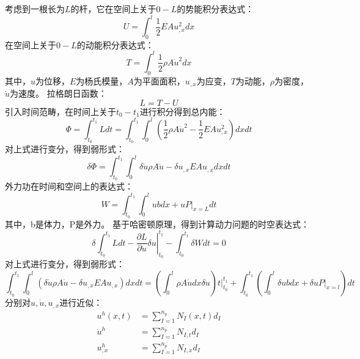 考虑到一根长为$L$的杆，它在空间上关于$0-L$的势能积分表达式：
\begin{equation}\label{3.1}
U = \int_{0}^{l} \frac{1}{2} EA u_{,x}^2 dx
\end{equation}
在空间上关于$0-L$的动能积分表达式：
\begin{equation}\label{3.2}
T = \int_{0}^{l} \frac{1}{2} \rho A \dot u^2 dx
\end{equation}
其中，$u$为位移，$E$为杨氏模量，$A$为平面面积，$u_{,x}$为应变，$T$为动能，$\rho$为密度，$\dot u$为速度。
拉格朗日函数：
\begin{equation}\label{3.3}
L = T-U
\end{equation}
引入时间范畴，在时间上关于$t_0 - t_1$进行积分得到总内能：
\begin{equation}\label{3.4}
\Phi = \int_{t_0}^{t_1} L dt = \int_{t_0}^{t_1} \int_{0}^{l} (\frac{1}{2} \rho A \dot u^2 - \frac{1}{2} EA u_{,x}^2) dx dt
\end{equation}
对上式进行变分，得到弱形式：
\begin{equation}\label{3.5}
\delta \Phi = \int_{t_0}^{t_1} \int_{0}^{l} \delta \dot u \rho A \dot u - \delta u_{,x} EA u_{,x} dx dt 
\end{equation}
外力功在时间和空间上的表达式：
\begin{equation}\label{3.6}
W = \int_{t_0}^{t_1} \int_{0}^{l}ub dx  +uP \vert_{x=L} dt
\end{equation}
其中，b是体力，P是外力。
基于哈密顿原理，得到计算动力问题的时空表达式：
\begin{equation}\label{3.7}
\delta \int_{t_0}^{t_1} L dt - \left . \frac{\partial L}{\partial \dot u} \delta u \right \vert_{t_0}^{t_1} - \int_{t_0}^{t_1} \delta W dt = 0
\end{equation}
对上式进行变分，得到弱形式：
\begin{equation}\label{3.8}
 \int_{t_0}^{t_1} \int_{0}^{l} (\delta \dot u \rho A \dot u - \delta u_{,x} EA u_{,x}) dx dt = (\int_{0}^{l} \rho A \dot udx \delta u)t \vert_{t_0}^{t_1} + \int_{t_0}^{t_1} (\int_{0}^{l} \delta ub dx  + \delta uP \vert_{x=l} )dt
\end{equation}
分别对$u, \dot u , u_{,x}$进行近似：
\begin{equation}\label{3.9}
\begin{split}
u^h(x,t) &= \sum_{I=1}^{n_p} N_I(x,t) d_I \\
\dot u^h &= \sum_{I=1}^{n_p} N_{I,t} d_I \\
u_{,x}^h &= \sum_{I=1}^{n_p} N_{I,x} d_I
\end{split}
\end{equation}
